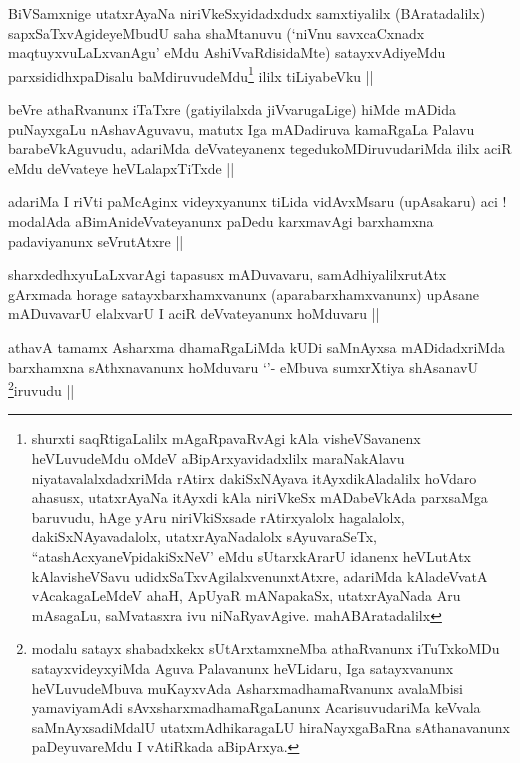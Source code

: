 \begin{artha}
BiVSamxnige utatxrAyaNa niriVkeSxyidadxdudx samxtiyalilx
(BAratadalilx) sapxSaTxvAgideyeMbudU saha shaMtanuvu (`niVnu
savxcaCxnadx maqtuyxvuLaLxvanAgu' eMdu AshiVvaRdisidaMte)
satayxvAdiyeMdu parxsididhxpaDisalu baMdiruvudeMdu\footnote{shurxti
  saqRtigaLalilx mAgaRpavaRvAgi kAla visheVSavanenx heVLuvudeMdu oMdeV
  aBipArxyavidadxlilx maraNakAlavu niyatavalalxdadxriMda rAtirx
  dakiSxNAyava itAyxdikAladalilx hoVdaro ahasusx, utatxrAyaNa itAyxdi
  kAla niriVkeSx mADabeVkAda parxsaMga baruvudu, hAge yAru
  niriVkiSxsade  rAtirxyalolx hagalalolx, dakiSxNAyavadalolx,
  utatxrAyaNadalolx sAyuvaraSeTx, ``atashAcxyaneV\s pidakiSxNeV' eMdu
  sUtarxkArarU idanenx heVLutAtx kAlavisheVSavu
  udidxSaTxvAgilalxvenunxtAtxre, adariMda kAladeVvatA vAcakagaLeMdeV
  ahaH, ApUyaR mANapakaSx, utatxrAyaNada Aru mAsagaLu, saMvatasxra ivu
  niNaRyavAgive. mahABAratadalilx} ililx tiLiyabeVku ||
\end{artha}

\begin{artha}
beVre athaRvanunx iTaTxre (gatiyilalxda jiVvarugaLige) hiMde mADida
puNayxgaLu nAshavAguvavu, matutx Iga mADadiruva kamaRgaLa Palavu
barabeVkAguvudu, adariMda deVvateyanenx tegedukoMDiruvudariMda ililx
aciR eMdu deVvateye heVLalapxTiTxde ||
\end{artha}


\begin{artha}
adariMa I riVti paMcAginx videyxyanunx tiLida vidAvxMsaru (upAsakaru)
aci ! modalAda aBimAnideVvateyanunx paDedu karxmavAgi barxhamxna
padaviyanunx seVrutAtxre ||
\end{artha}


\begin{artha}
sharxdedhxyuLaLxvarAgi tapasusx mADuvavaru, samAdhiyalilxrutAtx
gArxmada horage satayxbarxhamxvanunx (aparabarxhamxvanunx) upAsane
mADuvavarU elalxvarU I aciR deVvateyanunx hoMduvaru ||
\end{artha}


\begin{artha}
athavA tamamx Asharxma dhamaRgaLiMda kUDi saMnAyxsa mADidadxriMda
barxhamxna sAthxnavanunx hoMduvaru `\stext'- eMbuva sumxrXtiya
shAsanavU \footnote{modalu satayx shabadxkekx sUtArxtamxneMba
  athaRvanunx iTuTxkoMDu satayxvideyxyiMda Aguva Palavanunx heVLidaru,
Iga satayxvanunx heVLuvudeMbuva muKayxvAda AsharxmadhamaRvanunx
avalaMbisi yamaviyamAdi sAvxsharxmadhamaRgaLanunx AcarisuvudariMa
keVvala saMnAyxsadiMdalU utatxmAdhikaragaLU hiraNayxgaBaRna
sAthanavanunx paDeyuvareMdu I vAtiRkada aBipArxya.}iruvudu ||
\end{artha}

